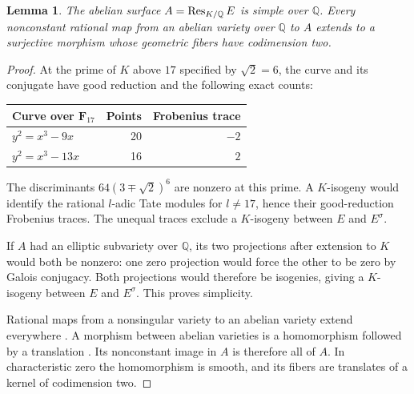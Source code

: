 \documentclass[11pt,a4paper]{article}
\newtheorem{lemma}[theorem]{Lemma}
\theoremstyle{remark}\newtheorem{remark}[theorem]{Remark}
\newcommand{\Q}{\mathbb Q}\newcommand{\Qbar}{\overline{\mathbb Q}}
\begin{document}
\begin{lemma}\label{lem:simple}
The abelian surface $A=\Res_{K/\Q}E$ is simple over $\Q$.
Every nonconstant rational map from an abelian variety over $\Q$
to $A$ extends to a surjective morphism whose geometric fibers have
codimension two.
\end{lemma}
\begin{proof}
At the prime of $K$ above $17$ specified by $\sqrt2=6$, the curve
and its conjugate have good reduction and the following exact counts:
\begin{center}
\begin{tabular}{lrr}\toprule
Curve over $\mathbf F_{17}$ & Points & Frobenius trace\\\midrule
$y^2=x^3-9x$ &20&$-2$\\
$y^2=x^3-13x$&16&$2$\\\bottomrule
\end{tabular}
\end{center}
The discriminants $64(3\mp\sqrt2)^6$ are nonzero at this prime.
A $K$-isogeny would identify the rational $l$-adic Tate modules
for $l\ne17$, hence their good-reduction Frobenius traces.
The unequal traces exclude a $K$-isogeny between $E$ and $E^\sigma$.

If $A$ had an elliptic subvariety over $\Q$, its two projections
after extension to $K$ would both be nonzero: one zero projection
would force the other to be zero by Galois conjugacy. Both projections
would therefore be isogenies, giving a $K$-isogeny between $E$ and
$E^\sigma$. This proves simplicity.

Rational maps from a nonsingular variety to an abelian variety extend
everywhere \cite[Theorem~3.1]{Milne}. A morphism between abelian
varieties is a homomorphism followed by a translation
\cite[Corollary~2.2]{Milne}. Its nonconstant image in $A$ is therefore
all of $A$. In characteristic zero the homomorphism is smooth, and
its fibers are translates of a kernel of codimension two.
\end{proof}
\end{document}
